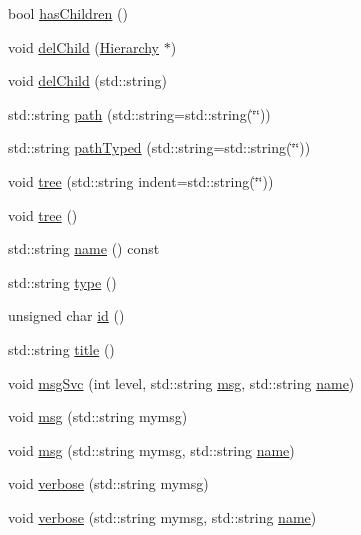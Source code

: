 \begin{DoxyCompactItemize}
\item 
bool \hyperlink{classHierarchy_a255174fe4d316d2a3f430dcb9dab29f1}{has\+Children} ()
\item 
void \hyperlink{classHierarchy_a2b2b359fac003233f65786a616766bde}{del\+Child} (\hyperlink{classHierarchy}{Hierarchy} $\ast$)
\item 
void \hyperlink{classHierarchy_a1928ac7615fe0b5e55cd707f70dc6781}{del\+Child} (std\+::string)
\item 
std\+::string \hyperlink{classHierarchy_aa7990fa7caf132d83e361ce033c6c65a}{path} (std\+::string=std\+::string(\char`\"{}\char`\"{}))
\item 
std\+::string \hyperlink{classHierarchy_a1efd56cd164d328d2002e53a10a19b8c}{path\+Typed} (std\+::string=std\+::string(\char`\"{}\char`\"{}))
\item 
void \hyperlink{classHierarchy_a76e914b9a677a22a82deb74d892bf261}{tree} (std\+::string indent=std\+::string(\char`\"{}\char`\"{}))
\item 
void \hyperlink{classHierarchy_a594c294c5f60c230e106d522ed008212}{tree} ()
\item 
std\+::string \hyperlink{classObject_a300f4c05dd468c7bb8b3c968868443c1}{name} () const
\item 
std\+::string \hyperlink{classObject_a84f99f70f144a83e1582d1d0f84e4e62}{type} ()
\item 
unsigned char \hyperlink{classObject_af99145335cc61ff6e2798ea17db009d2}{id} ()
\item 
std\+::string \hyperlink{classObject_a73a0f1a41828fdd8303dd662446fb6c3}{title} ()
\item 
void \hyperlink{classObject_a3f9d5537ebce0c0f2bf6ae4d92426f3c}{msg\+Svc} (int level, std\+::string \hyperlink{classObject_a58b2d0618c2d08cf2383012611528d97}{msg}, std\+::string \hyperlink{classObject_a300f4c05dd468c7bb8b3c968868443c1}{name})
\item 
void \hyperlink{classObject_a58b2d0618c2d08cf2383012611528d97}{msg} (std\+::string mymsg)
\item 
void \hyperlink{classObject_ac5d59299273cee27aacf7de00d2e7034}{msg} (std\+::string mymsg, std\+::string \hyperlink{classObject_a300f4c05dd468c7bb8b3c968868443c1}{name})
\item 
void \hyperlink{classObject_a83d2db2df682907ea1115ad721c1c4a1}{verbose} (std\+::string mymsg)
\item 
void \hyperlink{classObject_a2d4120195317e2a3c6532e8bb9f3da68}{verbose} (std\+::string mymsg, std\+::string \hyperlink{classObject_a300f4c05dd468c7bb8b3c968868443c1}{name})

\end{DoxyCompactItemize}
